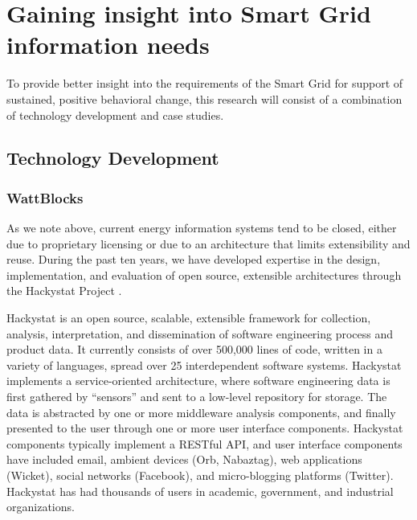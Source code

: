 \section{Gaining insight into Smart Grid information needs}
\label{sec:methodology}

To provide better insight into the requirements of the Smart Grid for
support of sustained, positive behavioral change, this research will
consist of a combination of  technology development and case studies.

\subsection{Technology Development}

\subsubsection{WattBlocks}

As we note above, current energy information systems tend to be closed,
either due to proprietary licensing or due to an architecture that limits
extensibility and reuse.  During the past ten years, we have developed
expertise in the design, implementation, and evaluation of open source,
extensible architectures through the Hackystat Project \cite{csdl2-09-02,csdl2-09-07,csdl2-09-01,csdl2-06-06}.  

Hackystat is an open source, scalable, extensible framework for collection,
analysis, interpretation, and dissemination of software engineering process
and product data.  It currently consists of over 500,000 lines of code,
written in a variety of languages, spread over 25 interdependent software
systems.  Hackystat implements a service-oriented architecture, where
software engineering data is first gathered by ``sensors'' and sent to a
low-level repository for storage.  The data is abstracted by one or more
middleware analysis components, and finally presented to the user through
one or more user interface components.  Hackystat components typically
implement a RESTful API, and user interface components have
included email, ambient devices (Orb, Nabaztag), web applications (Wicket),
social networks (Facebook), and micro-blogging platforms (Twitter).
Hackystat has had thousands of users in academic, government, and
industrial organizations.


